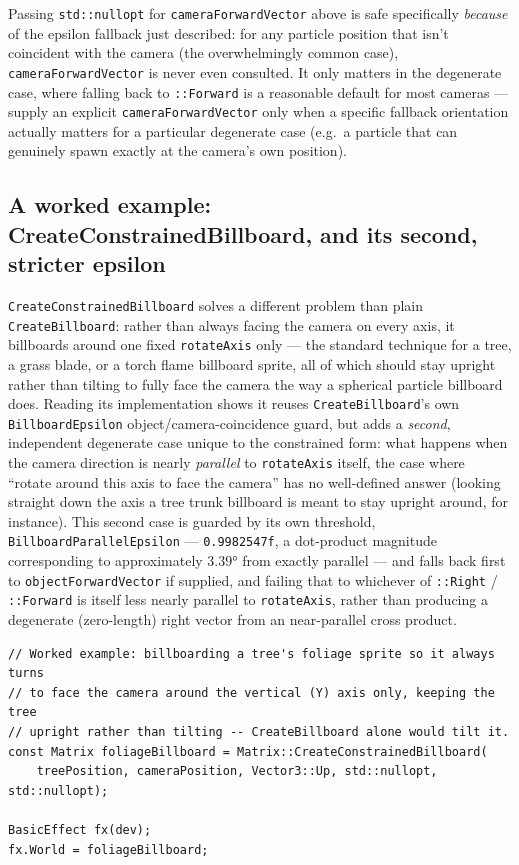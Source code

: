 Passing \texttt{std::nullopt} for \texttt{cameraForwardVector} above is safe specifically
\emph{because} of the epsilon fallback just described: for any particle position that isn't
coincident with the camera (the overwhelmingly common case), \texttt{cameraForwardVector} is
never even consulted. It only matters in the degenerate case, where falling back to
\texttt{::Forward} is a reasonable default for most cameras --- supply an
explicit \texttt{cameraForwardVector} only when a specific fallback orientation actually
matters for a particular degenerate case (e.g.\ a particle that can genuinely spawn exactly at
the camera's own position).

\subsection{A worked example: CreateConstrainedBillboard, and its second, stricter epsilon}

\texttt{CreateConstrainedBillboard} solves a different problem than plain
\texttt{CreateBillboard}: rather than always facing the camera on every axis, it billboards
around one fixed \texttt{rotateAxis} only --- the standard technique for a tree, a grass
blade, or a torch flame billboard sprite, all of which should stay upright rather than tilting
to fully face the camera the way a spherical particle billboard does. Reading its
implementation shows it reuses \texttt{CreateBillboard}'s own \texttt{BillboardEpsilon}
object/camera-coincidence guard, but adds a \emph{second}, independent degenerate case unique
to the constrained form: what happens when the camera direction is nearly \emph{parallel} to
\texttt{rotateAxis} itself, the case where ``rotate around this axis to face the camera'' has
no well-defined answer (looking straight down the axis a tree trunk billboard is meant to
stay upright around, for instance). This second case is guarded by its own threshold,
\texttt{BillboardParallelEpsilon} --- \texttt{0.9982547f}, a dot-product magnitude corresponding
to approximately $3.39$° from exactly parallel --- and falls back first to
\texttt{objectForwardVector} if supplied, and failing that to whichever of
\texttt{::Right} / \texttt{::Forward} is itself less nearly parallel to
\texttt{rotateAxis}, rather than producing a degenerate (zero-length) right vector from an
near-parallel cross product.

\begin{lstlisting}
// Worked example: billboarding a tree's foliage sprite so it always turns
// to face the camera around the vertical (Y) axis only, keeping the tree
// upright rather than tilting -- CreateBillboard alone would tilt it.
const Matrix foliageBillboard = Matrix::CreateConstrainedBillboard(
    treePosition, cameraPosition, Vector3::Up, std::nullopt, std::nullopt);

BasicEffect fx(dev);
fx.World = foliageBillboard;
\end{lstlisting}

